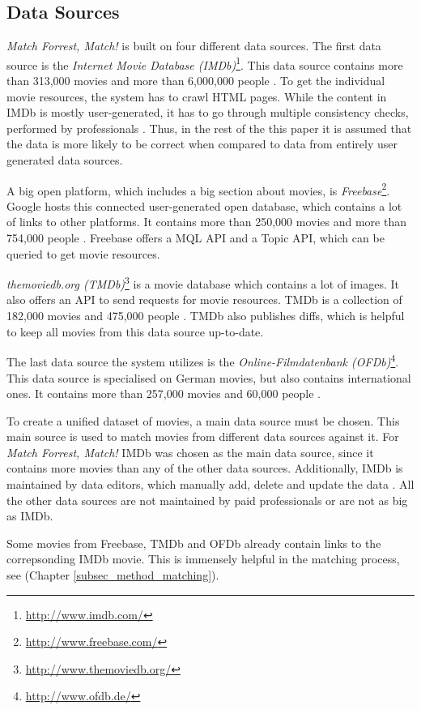 \subsection{Data Sources}
\label{subsec_method_datasources}

\emph{Match Forrest, Match!} is built on four different data sources.
The first data source is the \textit{Internet Movie Database (IMDb)}\footnote{\url{http://www.imdb.com/}}.
This data source contains more than 313,000 movies and more than 6,000,000 people \cite{IMDb_stats}.
To get the individual movie resources, the system has to crawl HTML pages.
While the content in IMDb is mostly user-generated, it has to go through multiple consistency checks, performed by professionals \cite{IMDb_DataCreation, IMDb_amazon}.
Thus, in the rest of the this paper it is assumed that the data is more likely to be correct when compared to data from entirely user generated data sources.

A big open platform, which includes a big section about movies, is \textit{Freebase}\footnote{\url{http://www.freebase.com/}}.
Google hosts this connected user-generated open database, which contains a lot of links to other platforms.
It contains more than 250,000 movies and more than 754,000 people \cite{Freebase_stats}.
Freebase offers a MQL API and a Topic API, which can be queried to get movie resources.

\textit{themoviedb.org (TMDb)}\footnote{\url{http://www.themoviedb.org/}} is a movie database which contains a lot of images.
It also offers an API to send requests for movie resources.
TMDb is a collection of 182,000 movies and 475,000 people \cite{TMDb_stats}.
TMDb also publishes diffs, which is helpful to keep all movies from this data source up-to-date.

The last data source the system utilizes is the \textit{Online-Filmdatenbank (OFDb)}\footnote{\url{http://www.ofdb.de/}}.
This data source is specialised on German movies, but also contains international ones.
It contains more than 257,000 movies and 60,000 people \cite{OFDb_stats}.

To create a unified dataset of movies, a main data source must be chosen.
This main source is used to match movies from different data sources against it.
For \emph{Match Forrest, Match!} IMDb was chosen as the main data source, since it contains more movies than any of the other data sources.
Additionally, IMDb is maintained by data editors, which manually add, delete and update the data \cite{IMDb_DataCreation, IMDb_amazon}.
All the other data sources are not maintained by paid professionals or are not as big as IMDb.

Some movies from Freebase, TMDb and OFDb already contain links to the correpsonding IMDb movie.
This is immensely helpful in the matching process, see (Chapter \ref{subsec_method_matching}).